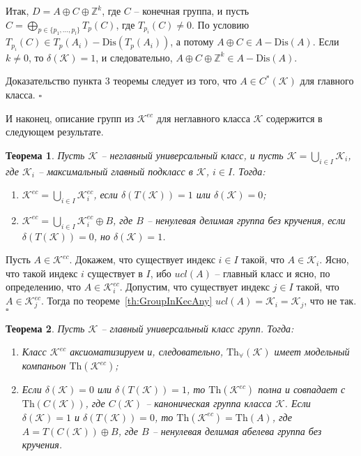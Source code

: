 \documentclass[12pt]{extarticle} %
\newtheorem{theorem}{Теорема}[section]
\def\proof{{\noindent{\bf Доказательство.}} }
\def\K{{\mathcal{K}}}
\def\Kec{\mathcal{K}^{ec}}
\def\Z{{\mathbb{Z}}}
\def\Th{{\mathrm{Th}}}
\def\Tha{{\mathrm{Th}_\forall}}
\def\Dis{{\mathrm{Dis}}}
\begin{document}
Итак, $D = A \oplus C \oplus \Z^k$, где $C$ -- конечная группа, и пусть $C = \bigoplus\limits_{p \in \{p_1, \ldots, p_l\}} T_p(C)$, где $T_{p_i}(C) \neq 0$. По условию $T_{p_i}(C) \in T_p(A_i)-\Dis(T_p(A_i))$, а потому $A \oplus C \in A-\Dis(A)$. Если $k \neq 0$, то $\delta(\K) = 1$, и следовательно, $A \oplus C \oplus \Z^k \in A-\Dis(A)$. 

Доказательство пункта 3 теоремы следует из того, что $A \in C^*(\K)$ для главного класса. $\square$


И наконец, описание групп из $\Kec$ для неглавного класса $\K$ содержится в следующем результате.

\begin{theorem}
Пусть $\K$ -- неглавный универсальный класс, и пусть $\K = \bigcup\limits_{i \in I} \K_i$, где $\K_i$ -- максимальный главный подкласс в $\K$, $i \in I$. Тогда:
\begin{enumerate}
\item $\Kec = \bigcup\limits_{i \in I} \Kec_i$, если $\delta(T(\K)) = 1$ или $\delta(\K) = 0$;

\item $\Kec = \bigcup\limits_{i \in I} \Kec_i \oplus B$, где $B$ -- ненулевая делимая группа без кручения, если $\delta(T(\K)) = 0$, но $\delta(\K) = 1$.
\end{enumerate}
\end{theorem}

\proof Пусть $A \in \Kec$. Докажем, что существует индекс $i \in I$ такой, что $A \in \K_i$. Ясно, что такой индекс $i$ существует в $I$, ибо $ucl(A)$ -- главный класс и ясно, по определению, что $A \in \Kec_i$. Допустим, что существует индекс $j \in I$ такой, что $A \in \Kec_j$. Тогда по теореме~\ref{th:GroupInKecAny} $ucl(A) = \K_i = \K_j$, что не так. $\square$


\begin{theorem}\label{th:AxiomsOfKec}
Пусть $\K$ -- главный универсальный класс групп. Тогда:
\begin{enumerate}
\item Класс $\Kec$ аксиоматизируем и, следовательно, $\Tha(\K)$ имеет модельный компаньон $\Th(\Kec)$;
\item Если $\delta(\K) = 0$ или $\delta(T(\K)) = 1$, то $\Th(\Kec)$ полна и совпадает с $\Th(C(\K))$, где $C(\K)$ -- каноническая группа класса $\K$. Если $\delta(\K) = 1$ и $\delta(T(\K)) = 0$, то $\Th(\Kec) = \Th(A)$, где $A = T(C(\K)) \oplus B$, где $B$ -- ненулевая делимая абелева группа без кручения.
\end{enumerate}
\end{theorem}
\end{document}
